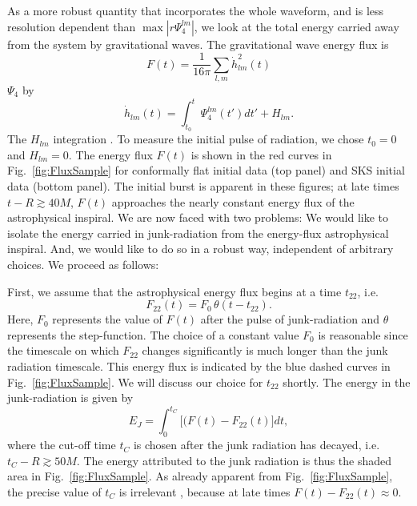 As a more robust quantity that incorporates the whole waveform, and is
less resolution dependent than $\max{|r\Psi_4^{lm}|}$, we look at the
total energy carried away from the system by gravitational waves. The
 gravitational wave energy flux is~\cite{Boyle:2008}
\begin{equation}
F(t) =\frac{1}{16\pi}\sum_{l,m}\dot{h}_{lm}^2(t)
\end{equation}
$\Psi_4$ by
\begin{equation}
\dot{h}_{lm}(t)=\int_{t_0}^{t}{\Psi_4^{lm}(t')dt'} + H_{lm}.
\end{equation}
 The $H_{lm}$   integration .  To measure the
  initial pulse of radiation, we chose $t_0=0$ and $H_{lm}=0$.  The energy flux $F(t)$ is shown in
the red curves in Fig.~\ref{fig:FluxSample} for conformally flat initial data (top
panel) and SKS initial data (bottom panel).  The initial burst
  is apparent in these figures; at late times $t-R\gtrsim 40M$, $F(t)$
  approaches the nearly constant energy flux of the astrophysical
  inspiral.  We are now faced with two problems: We would like to
  isolate the energy carried in junk-radiation from the energy-flux
  astrophysical inspiral.  And, we would like to do so in a robust way, 
independent of arbitrary choices.  We
  proceed as follows:

  First, we assume that the astrophysical energy flux begins at a time
  $t_{22}$, i.e.
\begin{equation}
  F_{22}(t) = F_0\,\theta(t-t_{22}).
\end{equation}
Here, $F_0$ represents the value of $F(t)$ after the pulse of
junk-radiation and $\theta$ represents the step-function.
The choice of a constant value $F_0$ is reasonable since the
timescale on which $F_{22}$ changes significantly is much longer than
the junk radiation timescale.  This energy flux is indicated by the blue dashed curves in Fig.~\ref{fig:FluxSample}.
We will
discuss our choice for $t_{22}$ shortly.  The energy in the
junk-radiation is given by
\begin{equation}\label{eq:EJ}
E_J=\int_0^{t_C}\big[(F(t)-F_{22}(t)\big]dt,
\end{equation}
where the cut-off time $t_C$ is chosen after the junk radiation has
decayed, i.e. $t_C-R\gtrsim 50M$.  The energy attributed to the junk
radiation is thus the shaded area in Fig.~\ref{fig:FluxSample}.  As
already apparent from Fig.~\ref{fig:FluxSample}, the precise value of
$t_C$ is irrelevant , because at late times $F(t)-F_{22}(t)\approx 0$.  

